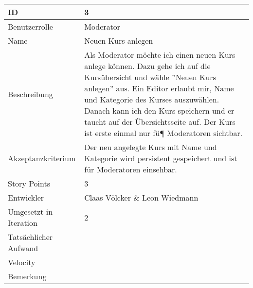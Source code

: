 \begin{tabularx}{\textwidth}{|p{}|X|}
	\hline
	ID & 3\\
	\hline
	Benutzerrolle & Moderator\\
	\hline
	Name & Neuen Kurs anlegen\\
	\hline
	Beschreibung & Als Moderator möchte ich einen neuen Kurs anlege können. Dazu gehe ich auf die Kursübersicht und wähle ''Neuen Kurs anlegen'' aus. Ein Editor erlaubt mir, Name und Kategorie des Kurses auszuwählen. Danach kann ich den Kurs speichern und er taucht auf der Übersichtsseite auf. Der Kurs ist erste einmal nur fü¶ Moderatoren sichtbar.
\\
	\hline
	Akzeptanzkriterium & Der neu angelegte Kurs mit Name und Kategorie wird persistent gespeichert und ist für Moderatoren einsehbar.\\
	\hline
	Story Points & 3\\
	\hline
	Entwickler & Claas Völcker \& Leon Wiedmann\\
	\hline
	Umgesetzt in Iteration & 2\\
	\hline
	Tatsächlicher Aufwand & \\
	\hline
	Velocity & \\
	\hline
	Bemerkung & \\
	\hline
\end{tabularx}
\vspace{20pt}

